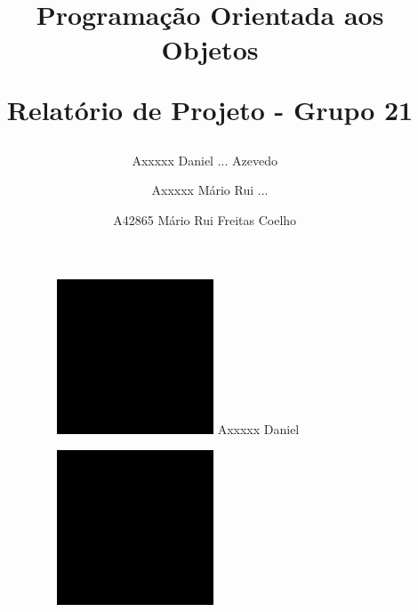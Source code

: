 \documentclass[11pt]{article}
\date{\vspace{-5ex}}
\title{Programação Orientada aos Objetos

Relatório de Projeto - Grupo 21}
\author{
	Axxxxx Daniel ... Azevedo  \
	\and
	Axxxxx Mário Rui ...
	\and
	A42865 Mário Rui Freitas Coelho \
}
\begin{document}
\maketitle

\begin{figure}[h!]
	\centering
	\begin{subfigure}[h!]{0.3\linewidth}
		\centering
		\includegraphics[width=\linewidth]{Daniel.jpeg}
		Axxxxx Daniel
	\end{subfigure}%
	\begin{subfigure}[h!]{0.3\linewidth}
		\centering
		\includegraphics[width=\linewidth]{Mario.jpeg}

\end{subfigure}
\end{figure}
\end{document}
